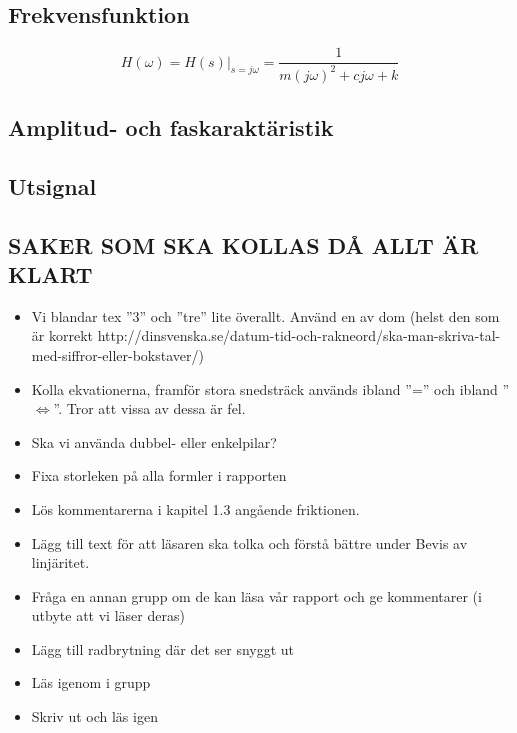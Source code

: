 \subsection{Frekvensfunktion}
$$H(\omega)=H(s)\bigg\rvert_{s=j\omega}=\dfrac{1}{m(j\omega)^2+cj\omega+k}$$

\subsection{Amplitud- och faskaraktäristik}


\subsection{Utsignal}

\subsection{SAKER SOM SKA KOLLAS DÅ ALLT ÄR KLART}
\begin{itemize}
    \item Vi blandar tex ''3'' och ''tre'' lite överallt. Använd en av dom (helst den som är korrekt http://dinsvenska.se/datum-tid-och-rakneord/ska-man-skriva-tal-med-siffror-eller-bokstaver/)
    \item Kolla ekvationerna, framför stora snedsträck används ibland ''='' och ibland ''$\Longleftrightarrow$''. Tror att vissa av dessa är fel.
    \item Ska vi använda dubbel- eller enkelpilar? 
    \item Fixa storleken på alla formler i rapporten
    \item Lös kommentarerna i kapitel 1.3 angående friktionen.
    \item Lägg till text för att läsaren ska tolka och förstå bättre under Bevis av linjäritet.
    \item Fråga en annan grupp om de kan läsa vår rapport och ge kommentarer (i utbyte att vi läser deras)
    \item Lägg till radbrytning där det ser snyggt ut
    \item Läs igenom i grupp
    \item Skriv ut och läs igen
\end{itemize}
